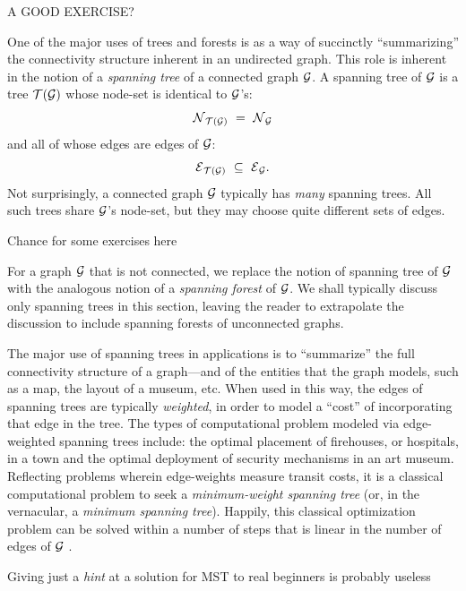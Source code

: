 {\Arny A GOOD EXERCISE?}

One of the major uses of trees and forests is as a way of succinctly
``summarizing'' the connectivity structure inherent in an undirected
graph.  This role is inherent in the notion of a {\it spanning tree}
  of a connected
graph $\mbox{$\cal G$}$.  A spanning tree of $\mbox{$\cal G$}$ is a tree $\mbox{$\cal T$}(\mbox{$\cal G$})$ whose node-set
is identical to $\mbox{$\cal G$}$'s:
\[ \mbox{$\cal N$}_{\mbox{{\scriptsize $\cal T$}}(\mbox{{\scriptsize $\cal G$}})} \ = \ \mbox{$\cal N$}_{\mbox{{\scriptsize $\cal G$}}} \]
and all of whose edges are edges of $\mbox{$\cal G$}$:
\[ \mbox{$\cal E$}_{\mbox{{\scriptsize $\cal T$}}(\mbox{{\scriptsize $\cal G$}})} \ \subseteq \ \mbox{$\cal E$}_{\mbox{{\scriptsize $\cal G$}}}. \]
Not surprisingly, a connected graph $\mbox{$\cal G$}$  typically has {\em many}
spanning trees.  All such trees share $\mbox{$\cal G$}$'s node-set, but they may
choose quite different sets of edges.

{\Arny Chance for some exercises here}

For a graph $\mbox{$\cal G$}$ that is not connected, we replace the notion of
spanning tree of $\mbox{$\cal G$}$ with the analogous notion of a {\it spanning
  forest}   of
$\mbox{$\cal G$}$.  We shall typically discuss only spanning trees in this section,
leaving the reader to extrapolate the discussion to include spanning
forests of unconnected graphs.

The major use of spanning trees in applications is to ``summarize''
the full connectivity structure of a graph---and of the entities that
the graph models, such as a map, the layout of a museum, etc.  When
used in this way, the edges of spanning trees are typically {\em
  weighted},  in order to
model a ``cost'' of incorporating that edge in the tree.  The types of
computational problem modeled via edge-weighted spanning trees
include: the optimal placement of firehouses, or hospitals, in a town
and the optimal deployment of security mechanisms in an art museum.
Reflecting problems wherein edge-weights measure transit costs, it is
a classical computational problem to seek a {\em minimum-weight
  spanning tree} 
 (or, in the vernacular, a {\em
  minimum spanning tree}).  Happily, this classical optimization
problem can be solved within a number of steps that is linear in the
number of edges of $\mbox{$\cal G$}$ \cite{CLRS}.

{\Arny Giving just a {\em hint} at a solution for MST to real
  beginners is probably useless}

